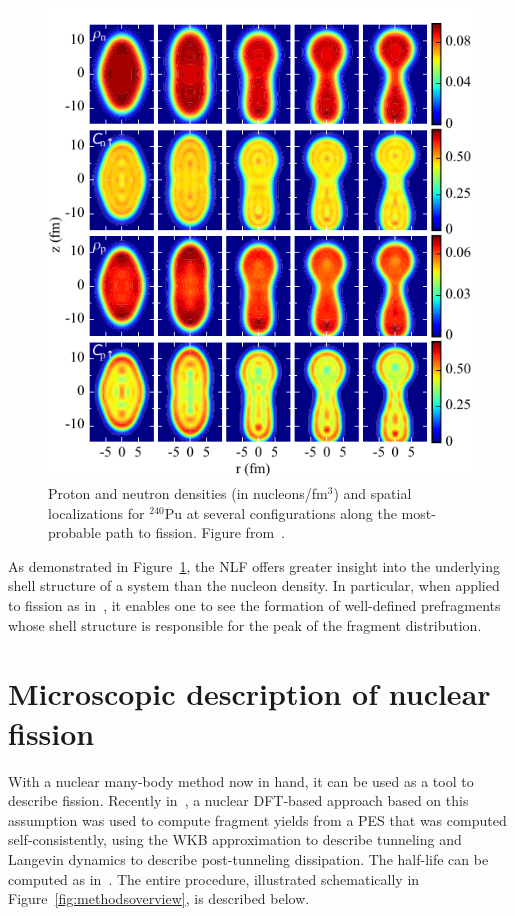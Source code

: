 \begin{figure}
	\centering
	\includegraphics[width=0.5\linewidth]{TeX_files/methods_locali}
	\caption[Proton and neutron densities (in nucleons/fm$^3$) and spatial localizations for $^{240}$Pu at several configurations along the most-probable path to fission.]{Proton and neutron densities (in nucleons/fm$^3$) and spatial localizations for $^{240}$Pu at several configurations along the most-probable path to fission. Figure from~\cite{Zhang2016}.}
	\label{fig:methodslocali}
\end{figure}

As demonstrated in Figure~\ref{fig:methodslocali}, the NLF offers greater insight into the underlying shell structure of a system than the nucleon density. In particular, when applied to fission as in~\cite{Sadhukhan2017}, it enables one to see the formation of well-defined prefragments whose shell structure is responsible for the peak of the fragment distribution.


\section{Microscopic description of nuclear fission}\label{sect:fissionmethod}
With a nuclear many-body method now in hand, it can be used as a tool to describe fission. Recently in~\cite{Sadhukhan2016}, a nuclear DFT-based approach based on this assumption was used to compute fragment yields from a PES that was computed self-consistently, using the WKB approximation to describe tunneling and Langevin dynamics to describe post-tunneling dissipation. The half-life can be computed as in~\cite{Sadhukhan2013}. The entire procedure, illustrated schematically in Figure~\ref{fig:methodsoverview}, is described below.

